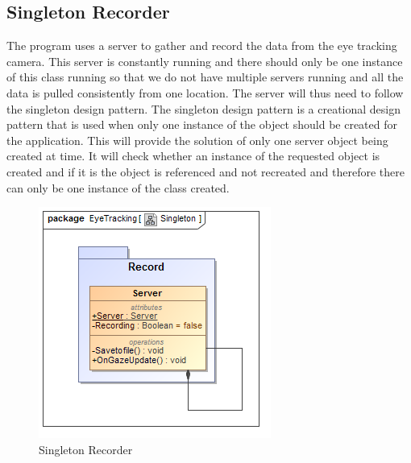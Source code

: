\subsection{Singleton Recorder}
The program uses a server to gather and record the data from the eye tracking camera. This server is constantly running and there should only be one instance of this class running so that we do not have multiple servers running and all the data is pulled consistently from one location. The server will thus need to follow the singleton design pattern. The singleton design pattern is a creational design pattern that is used when only one instance of the object should be created for the application. This will provide the solution of only one server object being created at time. It will check whether an instance of the requested object is created and if it is the object is referenced and not recreated and therefore there can only be one instance of the class created.

	\begin{figure}[!ht]
		\centering
		\includegraphics[scale=0.5]{Diagrams/Class_Diagram__Singleton.png}
		\caption{Singleton Recorder}
	\end{figure}


%

